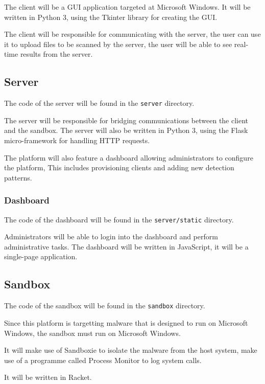 The client will be a GUI application targeted at Microsoft Windows.
It will be written in Python 3, using the Tkinter library for creating the GUI.

The client will be responsible for communicating with the server,
the user can use it to upload files to be scanned by the server,
the user will be able to see real-time results from the server.

\subsection{Server}
The code of the server will be found in the \texttt{server} directory.

The server will be responsible for bridging communications between the client and the sandbox.
The server will also be written in Python 3, using the Flask micro-framework for handling HTTP requests.

The platform will also feature a dashboard allowing administrators to configure the platform,
This includes provisioning clients and adding new detection patterns.

\subsubsection{Dashboard}

The code of the dashboard will be found in the \texttt{server/static} directory.

Administrators will be able to login into the dashboard and perform administrative tasks.
The dashboard will be written in JavaScript, it will be a single-page application.



\subsection{Sandbox}
The code of the sandbox will be found in the \texttt{sandbox} directory.

Since this platform is targetting malware that is designed to run on Microsoft Windows,
the sandbox must run on Microsoft Windows.

It will make use of Sandboxie to isolate the malware from the host system,
make use of a programme called Process Monitor to log system calls.

It will be written in Racket.



